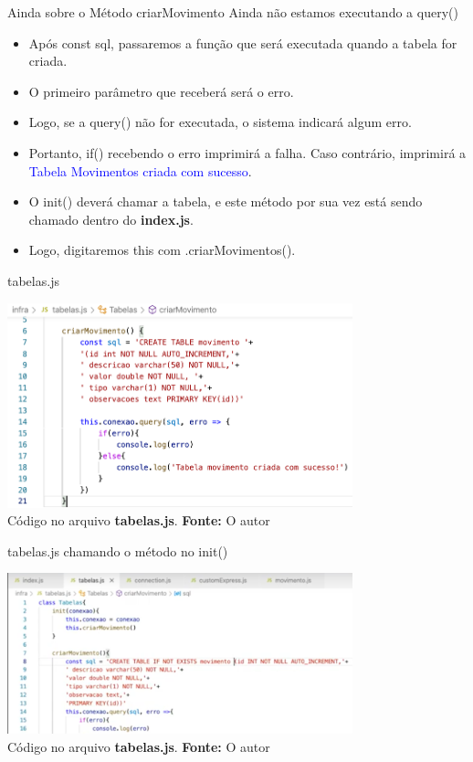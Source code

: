 \documentclass{beamer}
\begin{document}
  \begin{frame}{Ainda sobre o Método criarMovimento}
  Ainda não estamos executando a \alert{query()}
   \begin{itemize}
   \item Após \alert{const sql}, passaremos a função que será executada quando a tabela for criada. 
   \item O primeiro parâmetro que receberá será o erro.
   \item Logo, se a \alert{query()} não for executada, o sistema indicará algum erro. 
   \item Portanto, \alert{if()} recebendo o erro imprimirá a falha. Caso contrário, imprimirá a \textcolor{blue}{Tabela Movimentos criada com sucesso}.
   \item O \alert{init()} deverá chamar a tabela, e este método por sua vez está sendo chamado dentro do \textbf{index.js}. 
   \item Logo, digitaremos this com \alert{.criarMovimentos()}.
   \end{itemize}
  \end{frame}
  
    \begin{frame}{tabelas.js}
         \begin{center}
    	\includegraphics[width=100mm]{resources/aula6_8.png}\\
        \tiny{ Código no arquivo \textbf{tabelas.js}. \textbf{Fonte:} O autor}
     \end{center}   
    \end{frame}

    \begin{frame}{tabelas.js chamando o método no init()}
         \begin{center}
    	\includegraphics[width=100mm]{resources/aula6_9.png}\\
        \tiny{ Código no arquivo \textbf{tabelas.js}. \textbf{Fonte:} O autor}
     \end{center}   
    \end{frame}
\end{document}
